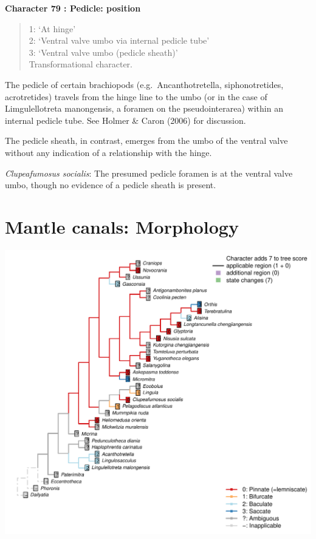 \documentclass[]{book}
\theoremstyle{definition}
\theoremstyle{definition}
\theoremstyle{definition}
\theoremstyle{remark}
\begin{document}
\textbf{Character 79 : Pedicle: position }

\begin{quote}
1: `At hinge'\\
2: `Ventral valve umbo via internal pedicle tube'\\
3: `Ventral valve umbo (pedicle sheath)'\\
Transformational character.
\end{quote}

The pedicle of certain brachiopods (e.g.~Ancanthotretella,
siphonotretides, acrotretides) travels from the hinge line to the umbo
(or in the case of Limgulellotreta manongensis, a foramen on the
pseudointerarea) within an internal pedicle tube. See Holmer \& Caron
(2006) for discussion.

The pedicle sheath, in contrast, emerges from the umbo of the ventral
valve without any indication of a relationship with the hinge.

\emph{Clupeafumosus socialis}: The presumed pedicle foramen is at the
ventral valve umbo, though no evidence of a pedicle sheath is present.

\hypertarget{mantle-canals-morphology}{%
\section*{Mantle canals: Morphology}\label{mantle-canals-morphology}}

\includegraphics{Brachiopod_phylogeny_files/figure-latex/unnamed-chunk-5-80.pdf}
\end{document}
